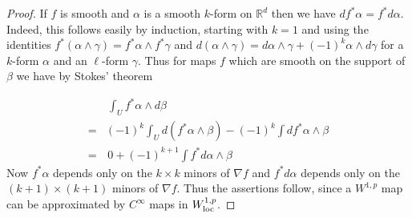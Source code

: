 \documentclass[titlepage]{amsart}
\numberwithin{equation}{section}
\theoremstyle{plain}
\theoremstyle{definition}
\theoremstyle{remark}
\newcommand{\R}{\mathbb{R}}
\newcommand{\g}{\nabla }
\begin{document}
\begin{proof} If $f$ is smooth and $\alpha$  is a smooth $k$-form on $\R^d$ then 
we have $d f^* \alpha = f^* d \alpha$.  Indeed, this follows easily by induction, 
starting with $k = 1$ and using the identities $f^*(\alpha \wedge \gamma) = f^* \alpha \wedge f^* \gamma$
 and     $d(\alpha \wedge \gamma) = d\alpha \wedge \gamma +  (-1)^k  \alpha \wedge d\gamma$ for a $k$-form
 $\alpha$ and an $\ell$-form $\gamma$.  
 Thus for maps $f$  which are smooth on the support of $\beta$   we have by Stokes'  theorem

\begin{align*}&  \, \int_U f^*\alpha \wedge d\beta  \\= & (-1)^k \int_U d(f^*\alpha \wedge \beta)  - (-1)^k \int df^*\alpha \wedge \beta \\
=  & \,  0 +  (-1)^{k+1} \int f^*d\alpha \wedge \beta 
\end{align*}
Now  $f^*\alpha$  depends only on the $k \times k$  minors of $\g f$ and $f^*d\alpha$ depends only on the $(k+1) \times (k+1)$ minors of $\g f$.   Thus the assertions follow,
 since a $W^{1,p}$ map can be approximated by $C^\infty$  maps in $W^{1,p}_{\rm loc}$.
 \end{proof}
 
\end{document}
